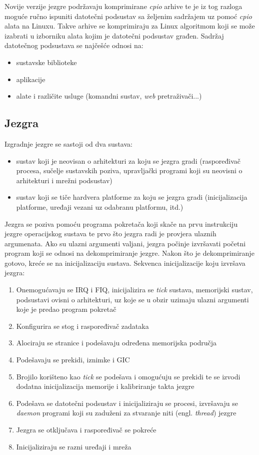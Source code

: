 \documentclass[times, utf8, diplomski, numeric]{fer}
\begin{document}
Novije verzije jezgre podržavaju komprimirane \textit{cpio} arhive te je iz tog razloga moguće ručno ispuniti datotečni
podsustav sa željenim sadržajem uz pomoć \textit{cpio} alata na Linuxu. Takve arhive se komprimiraju za Linux algoritmom
koji se može izabrati u izborniku alata kojim je datotečni podsustav građen.
Sadržaj datotečnog podsustava se najčešće odnosi na:
\begin{itemize}
  \item{sustavske biblioteke}
  \item{aplikacije}
  \item{alate i različite usluge (komandni sustav, \textit{web} pretraživači...)}
\end{itemize}

\subsection{Jezgra}
Izgradnje jezgre se sastoji od dva sustava:
\begin{itemize}
  \item{sustav koji je neovisan o arhitekturi za koju se jezgra gradi (raspoređivač procesa, sučelje sustavskih poziva,
  upravljački programi koji su neovisni o arhitekturi i mrežni podsustav)}
  \item{sustav koji se tiče hardvera platforme za koju se jezgra gradi (inicijalizacija platforme, uređaji vezani uz odabranu
  platformu, itd.)}
\end{itemize}
Jezgra se poziva pomoću programa pokretača koji skače na prvu instrukciju jezgre operacijskog sustava te prvo što jezgra radi je
provjera ulaznih argumenata. Ako su ulazni argumenti valjani, jezgra počinje izvršavati početni program koji se odnosi na
dekomprimiranje jezgre. Nakon što je dekomprimiranje gotovo, kreće se na inicijalizaciju sustava. Sekvenca inicijalizacije
koju izvršava jezgra:
\begin{enumerate}
  \item{Onemogućavaju se IRQ i FIQ, inicijalizira se \textit{tick} sustava, memorijski sustav, podsustavi ovisni o arhitekturi,
  uz koje se u obzir uzimaju ulazni argumenti koje je predao program pokretač}
  \item{Konfigurira se stog i raspoređivač zadataka}
  \item{Alociraju se stranice i podešavaju određena memorijska područja}
  \item{Podešavaju se prekidi, iznimke i GIC}
  \item{Brojilo korišteno kao \textit{tick} se podešava i omogućuju se prekidi te se izvodi dodatna inicijalizacija memorije i
  kalibriranje takta jezgre}
  \item{Podešava se datotečni podsustav i inicijaliziraju se procesi, izvršavaju se \textit{daemon} programi koji su zaduženi
  za stvaranje niti (engl. \textit{thread}) jezgre}
  \item{Jezgra se otključava i raspoređivač se pokreće}
  \item{Inicijaliziraju se razni uređaji i mreža}
\end{enumerate}
\end{document}
